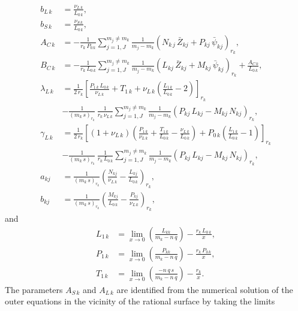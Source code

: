 \documentclass[12pt,prb,aps,notitlepage]{revtex4-1}
\begin{document}
\begin{align}
b_{L\,k} &= \frac{\nu_{L\,k}}{L_{0\,k}},\\[0.5ex]
b_{S\,k} &= \frac{\nu_{S\,k}}{L_{0\,k}},\\[0.5ex]
A_{C\,k} &= - \frac{1}{r_k\,P_{0\,k}}\sum_{j=1,J}^{m_j\neq m_k}\frac{1}{m_j-m_k}\left(N_{k\,j}\,\bar{Z}_{kj}+ P_{kj}\,\bar{\psi}_{kj}\right)_{r_k},\label{ex12}\\[0.5ex]
B_{C\,k} &= - \frac{1}{r_k\,L_{0\,k}}\sum_{j=1,J}^{m_j\neq m_k}\frac{1}{m_j-m_k}\left(L_{kj}\,\bar{Z}_{kj}+ M_{kj}\,\bar{\psi}_{kj}\right)_{r_k}+\frac{A_{C\,k}}{L_{0\,k}},\label{ex13}\\[0.5ex]
\lambda_{L\,k} &= \frac{1}{2\,r_k}\left[\frac{P_{1\,k}\,L_{0\,k}}{\nu_{L\,k}} + T_{1\,k} + \nu_{L\,k}\left(\frac{L_{1\,k}}{L_{0\,k}}-2\right)\right]_{r_k}\nonumber\\[0.5ex]&
-\frac{1}{(m_k\,s)_{r_k}}\,\frac{1}{r_k\,\nu_{L\,k}}\sum_{j=1,J}^{m_j\neq m_k}\frac{1}{m_j-m_k}\left(P_{kj}\,L_{kj}-M_{kj}\,N_{kj}\right)_{r_k},\label{ex14}\\[0.5ex]
\gamma_{L\,k} &=\frac{1}{2\,r_k}\left[(1+\nu_{L\,k})\left(\frac{P_{1\,k}}{\nu_{L\,k}}+\frac{T_{1\,k}}{L_{0\,k}}-\frac{\nu_{L\,k}}{L_{0\,k}}\right)+
P_{0\,k}\left(\frac{L_{1\,k}}{L_{0\,k}}-1\right)\right]_{r_k}\nonumber\\[0.5ex]
&-\frac{1}{(m_k\,s)_{r_k}}\,\frac{1}{r_k\,L_{0\,k}}\sum_{j=1,J}^{m_j\neq m_k}\frac{1}{m_j-m_k}\left(P_{kj}\,L_{kj}-M_{kj}\,N_{kj}\right)_{r_k},\label{ex15}\\[0.5ex]
a_{kj}&= \frac{1}{(m_k\,s)_{r_k}}\left(\frac{N_{kj}}{\nu_{L\,k}}-\frac{L_{kj}}{L_{0\,k}}\right)_{r_k},\\[0.5ex]
b_{kj}&= \frac{1}{(m_k\,s)_{r_k}}\left(\frac{M_{kj}}{L_{0\,k}}-\frac{P_{kj}}{\nu_{L\,k}}\right)_{r_k},
\end{align}
and
\begin{align}
L_{1\,k} &= \lim_{x\rightarrow 0}\left(\frac{L_{kk}}{m_k-n\,q}\right)-\frac{r_k\,L_{0\,k}}{x},\\[0.5ex]
P_{1\,k}&=  \lim_{x\rightarrow 0}\left(\frac{P_{kk}}{m_k-n\,q}\right) -\frac{r_k\,P_{0\,k}}{x},\\[0.5ex]
T_{1\,k} &= \lim_{x\rightarrow 0}\left(\frac{-n\,q\,s}{m_k-n\,q}\right)-\frac{r_k}{x}.
\end{align}
The parameters $A_{S\,k}$ and $A_{L\,k}$ are identified from the numerical solution of the outer equations in the
vicinity of the  rational surface 
by taking the limits
\end{document}

